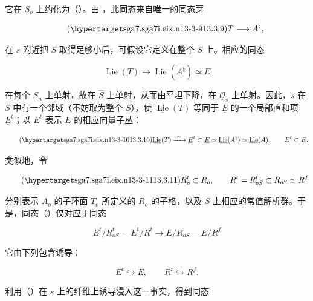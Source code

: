 \noindent
它在 $S_o$ 上约化为（）。由 ，此同态来自唯一的同态芽

\begin{equation}\tag{\SGARefTarget{sga7.sga7i.eix.n13-3-9}{13.3.9}}
 T\longrightarrow A^\natural,
\end{equation}

\noindent
在 $s$ 附近把 $S$ 取得足够小后，可假设它定义在整个 $S$ 上。相应的同态

\begin{equation*}
 \underline{\operatorname{Lie}}(T)\longrightarrow
 \underline{\operatorname{Lie}}(A^\natural)\simeq\underline E
\end{equation*}

\noindent
在每个 $S_n$ 上单射，故在 $\widehat S$ 上单射，从而由平坦下降，在 $\underline{\mathcal O}_s$ 上单射。因此，$s$ 在 $S$ 中有一个邻域（不妨取为整个 $S$），使 $\underline{\operatorname{Lie}}(T)$ 等同于 $\underline E$ 的一个局部直和项 $\underline E^t$；以 $E^t$ 表示 $E$ 的相应向量子丛：

\begin{equation}\tag{\SGARefTarget{sga7.sga7i.eix.n13-3-10}{13.3.10}}
 \underline{\operatorname{Lie}}(T)\xrightarrow{\ \sim\ }
 \underline E^t\subset\underline E\simeq
 \underline{\operatorname{Lie}}(A^\natural)\simeq
 \underline{\operatorname{Lie}}(A),
 \qquad E^t\subset E.
\end{equation}

\noindent
类似地，令

\begin{equation}\tag{\SGARefTarget{sga7.sga7i.eix.n13-3-11}{13.3.11}}
 R_o^t\subset R_o,
 \qquad R^t=R_{oS}^t\subset R_{oS}\simeq R^f
\end{equation}

\noindent
分别表示 $A_o$ 的子环面 $T_o$ 所定义的 $R_o$ 的子格，以及 $S$ 上相应的常值解析群。于是，同态（）仅对应于同态

\begin{equation*}
 E^t/R_{oS}^t=E^t/R^t\longrightarrow E/R_{oS}=E/R^f
\end{equation*}

\noindent
它由下列包含诱导：

\begin{equation*}
 E^t\hookrightarrow E,
 \qquad R^t\hookrightarrow R^f.
\end{equation*}

\noindent
利用（）在 $s$ 上的纤维上诱导浸入这一事实，得到同态

